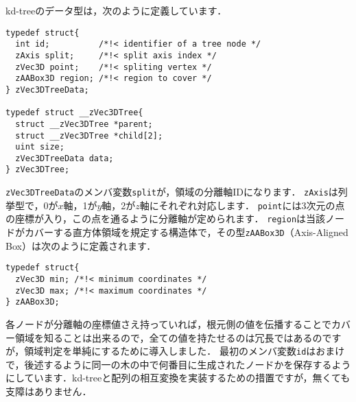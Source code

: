 ﻿\documentclass[a4paper]{jsarticle}
\begin{document}
kd-treeのデータ型は，次のように定義しています．
\begin{screen}
\begin{verbatim}
typedef struct{
  int id;          /*!< identifier of a tree node */
  zAxis split;     /*!< split axis index */
  zVec3D point;    /*!< spliting vertex */
  zAABox3D region; /*!< region to cover */
} zVec3DTreeData;

typedef struct __zVec3DTree{
  struct __zVec3DTree *parent;
  struct __zVec3DTree *child[2];
  uint size;
  zVec3DTreeData data;
} zVec3DTree;
\end{verbatim}
\end{screen}
\verb|zVec3DTreeData|のメンバ変数\verb|split|が，領域の分離軸IDになります．
\verb|zAxis|は列挙型で，0が$x$軸，1が$y$軸，2が$z$軸にそれぞれ対応します．
\verb|point|には3次元の点の座標が入り，この点を通るように分離軸が定められます．
\verb|region|は当該ノードがカバーする直方体領域を規定する構造体で，その型\verb|zAABox3D|（Axis-Aligned Box）は次のように定義されます．
\begin{screen}
\begin{verbatim}
typedef struct{
  zVec3D min; /*!< minimum coordinates */
  zVec3D max; /*!< maximum coordinates */
} zAABox3D;
\end{verbatim}
\end{screen}
各ノードが分離軸の座標値さえ持っていれば，根元側の値を伝播することでカバー領域を知ることは出来るので，全ての値を持たせるのは冗長ではあるのですが，領域判定を単純にするために導入しました．
最初のメンバ変数\verb|id|はおまけで，後述するように同一の木の中で何番目に生成されたノードかを保存するようにしています．kd-treeと配列の相互変換を実装するための措置ですが，無くても支障はありません．
\end{document}
